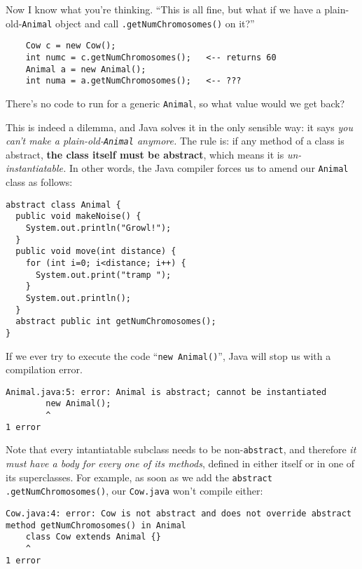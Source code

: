 \begin{samepage}
Now I know what you're thinking. ``This is all fine, but what if we have a
plain-old-\texttt{Animal} object and call \texttt{.getNumChromosomes()} on
it?'' 

\begin{verbatim}
    Cow c = new Cow();
    int numc = c.getNumChromosomes();   <-- returns 60
    Animal a = new Animal();
    int numa = a.getNumChromosomes();   <-- ???
\end{verbatim}

There's no code to run for a generic \texttt{Animal}, so what value would we
get back?
\end{samepage}

This is indeed a dilemma, and Java solves it in the only sensible way: it says
\textit{you can't make a plain-old-\texttt{Animal} anymore.} The rule is: if
any method of a class is abstract, \textbf{the class itself must be abstract},
which means it is \textit{un-instantiatable.} In other words, the Java
compiler forces us to amend our \texttt{Animal} class as follows:

\begin{Verbatim}[fontsize=\scriptsize,samepage=true,frame=single]
abstract class Animal {                         
  public void makeNoise() {            
    System.out.println("Growl!");      
  }                                    
  public void move(int distance) {     
    for (int i=0; i<distance; i++) {   
      System.out.print("tramp ");      
    }                                  
    System.out.println();              
  }
  abstract public int getNumChromosomes();
}                                      
\end{Verbatim}

If we ever try to execute the code ``\texttt{new Animal()}'', Java will stop us
with a compilation error.

\begin{Verbatim}[fontsize=\scriptsize,samepage=true]
Animal.java:5: error: Animal is abstract; cannot be instantiated
        new Animal();
        ^
1 error
\end{Verbatim}

\begin{samepage} Note that every intantiatable subclass needs to be
non-\texttt{abstract}, and therefore \textit{it must have a body for every one
of its methods}, defined in either itself or in one of its superclasses. For
example, as soon as we add the \texttt{abstract}
\texttt{.getNumChromosomes()}, our \texttt{Cow.java} won't compile either:

\scriptsize
\begin{Verbatim}[fontsize=\scriptsize,samepage=true]
Cow.java:4: error: Cow is not abstract and does not override abstract
method getNumChromosomes() in Animal
    class Cow extends Animal {}
    ^
1 error
\end{Verbatim}
\normalsize
\end{samepage}

